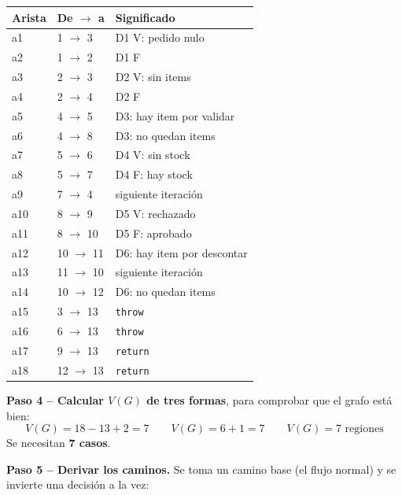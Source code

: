 \documentclass[11pt,a4paper,oneside]{report}
\newcommand{\code}[1]{\texttt{#1}}
\begin{document}
\begin{minipage}[t]{0.48\linewidth}
\vspace{0pt}
\scriptsize
\begin{tabular}{@{}lll@{}}
\toprule
\textbf{Arista} & \textbf{De $\rightarrow$ a} & \textbf{Significado}\\
\midrule
a1 & 1 $\rightarrow$ 3 & D1 V: pedido nulo\\
a2 & 1 $\rightarrow$ 2 & D1 F\\
a3 & 2 $\rightarrow$ 3 & D2 V: sin items\\
a4 & 2 $\rightarrow$ 4 & D2 F\\
a5 & 4 $\rightarrow$ 5 & D3: hay item por validar\\
a6 & 4 $\rightarrow$ 8 & D3: no quedan items\\
a7 & 5 $\rightarrow$ 6 & D4 V: sin stock\\
a8 & 5 $\rightarrow$ 7 & D4 F: hay stock\\
a9 & 7 $\rightarrow$ 4 & siguiente iteración\\
a10 & 8 $\rightarrow$ 9 & D5 V: rechazado\\
a11 & 8 $\rightarrow$ 10 & D5 F: aprobado\\
a12 & 10 $\rightarrow$ 11 & D6: hay item por descontar\\
a13 & 11 $\rightarrow$ 10 & siguiente iteración\\
a14 & 10 $\rightarrow$ 12 & D6: no quedan items\\
a15 & 3 $\rightarrow$ 13 & \code{throw}\\
a16 & 6 $\rightarrow$ 13 & \code{throw}\\
a17 & 9 $\rightarrow$ 13 & \code{return}\\
a18 & 12 $\rightarrow$ 13 & \code{return}\\
\bottomrule
\end{tabular}
\end{minipage}



\textbf{Paso 4 -- Calcular $V(G)$ de tres formas}, para comprobar que el grafo está bien:
\[
V(G) = 18 - 13 + 2 = 7 \qquad V(G) = 6 + 1 = 7 \qquad V(G) = 7 \text{ regiones}
\]
Se necesitan \textbf{7 casos}.

\textbf{Paso 5 -- Derivar los caminos.} Se toma un camino base (el flujo normal) y se invierte una decisión a la vez:
\end{document}

